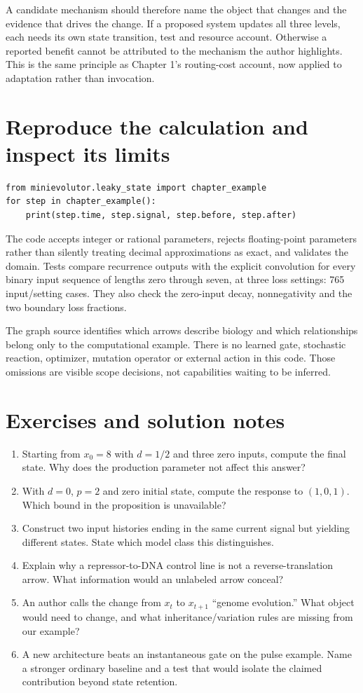 A candidate mechanism should therefore name the object that changes and the
evidence that drives the change. If a proposed system updates all three levels,
each needs its own state transition, test and resource account. Otherwise a
reported benefit cannot be attributed to the mechanism the author highlights.
This is the same principle as Chapter 1's routing-cost account, now applied to
adaptation rather than invocation.

\section{Reproduce the calculation and inspect its limits}
\begin{Verbatim}[fontsize=\small]
from minievolutor.leaky_state import chapter_example
for step in chapter_example():
    print(step.time, step.signal, step.before, step.after)
\end{Verbatim}
The code accepts integer or rational parameters, rejects floating-point
parameters rather than silently treating decimal approximations as exact,
and validates the domain. Tests compare recurrence outputs with the explicit
convolution for every binary input sequence of lengths zero through seven,
at three loss settings: 765 input/setting cases. They also check the zero-input
decay, nonnegativity and the two boundary loss fractions.

The graph source identifies which arrows describe biology and which relationships
belong only to the computational example. There is no learned gate, stochastic
reaction, optimizer, mutation operator or external action in this code. Those
omissions are visible scope decisions, not capabilities waiting to be inferred.

\section{Exercises and solution notes}
\begin{enumerate}
\item Starting from $x_0=8$ with $d=1/2$ and three zero inputs, compute the final
state. Why does the production parameter not affect this answer?
\item With $d=0$, $p=2$ and zero initial state, compute the response to
$(1,0,1)$. Which bound in the proposition is unavailable?
\item Construct two input histories ending in the same current signal but
yielding different states. State which model class this distinguishes.
\item Explain why a repressor-to-DNA control line is not a reverse-translation
arrow. What information would an unlabeled arrow conceal?
\item An author calls the change from $x_t$ to $x_{t+1}$ ``genome evolution.''
What object would need to change, and what inheritance/variation rules are
missing from our example?
\item A new architecture beats an instantaneous gate on the pulse example.
Name a stronger ordinary baseline and a test that would isolate the claimed
contribution beyond state retention.
\end{enumerate}

